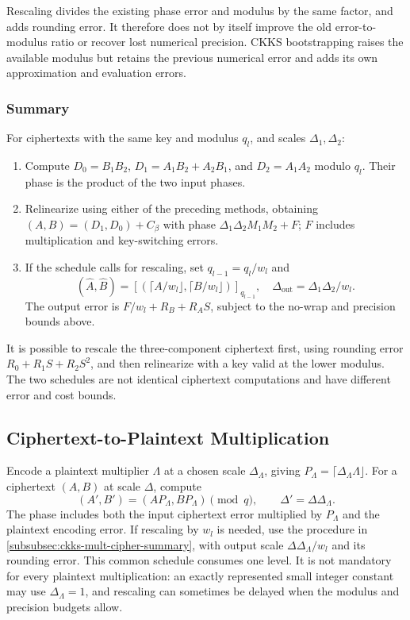  Rescaling divides the existing phase error and modulus by the same factor, and adds rounding error. It therefore does not by itself improve the old error-to-modulus ratio or recover lost numerical precision. CKKS bootstrapping raises the available modulus but retains the previous numerical error and adds its own approximation and evaluation errors.


\subsubsection{Summary}
\label{subsubsec:ckks-mult-cipher-summary}

\begin{tcolorbox}[title={\textbf{\tboxlabel{\ref*{subsubsec:ckks-mult-cipher-summary}} CKKS Ciphertext-to-Ciphertext Multiplication}}]
For ciphertexts with the same key and modulus $q_l$, and scales $\Delta_1,\Delta_2$:
\begin{enumerate}
\item Compute $D_0=B_1B_2$, $D_1=A_1B_2+A_2B_1$, and $D_2=A_1A_2$ modulo $q_l$. Their phase is the product of the two input phases.
\item Relinearize using either of the preceding methods, obtaining $(A,B)=(D_1,D_0)+C_\beta$ with phase $\Delta_1\Delta_2 M_1M_2+F$; $F$ includes multiplication and key-switching errors.
\item If the schedule calls for rescaling, set $q_{l-1}=q_l/w_l$ and
\[
(\widehat A,\widehat B)=[(\lceil A/w_l\rfloor,\lceil B/w_l\rfloor)]_{q_{l-1}},
\quad \Delta_{\mathrm{out}}=\Delta_1\Delta_2/w_l.
\]
The output error is $F/w_l+R_B+R_AS$, subject to the no-wrap and precision bounds above.
\end{enumerate}
 It is possible to rescale the three-component ciphertext first, using rounding error $R_0+R_1S+R_2S^2$, and then relinearize with a key valid at the lower modulus. The two schedules are not identical ciphertext computations and have different error and cost bounds.
\end{tcolorbox}


\subsection{Ciphertext-to-Plaintext Multiplication}
\label{subsec:ckks-mult-plain}

Encode a plaintext multiplier $\Lambda$ at a chosen scale $\Delta_\Lambda$, giving $P_\Lambda=\lceil\Delta_\Lambda\Lambda\rfloor$. For a ciphertext $(A,B)$ at scale $\Delta$, compute
\[
(A',B')=(AP_\Lambda,BP_\Lambda)\pmod q,
\qquad \Delta'=\Delta\Delta_\Lambda.
\]
The phase includes both the input ciphertext error multiplied by $P_\Lambda$ and the plaintext encoding error. If rescaling by $w_l$ is needed, use the procedure in \autoref{subsubsec:ckks-mult-cipher-summary}, with output scale $\Delta\Delta_\Lambda/w_l$ and its rounding error. This common schedule consumes one level. It is not mandatory for every plaintext multiplication: an exactly represented small integer constant may use $\Delta_\Lambda=1$, and rescaling can sometimes be delayed when the modulus and precision budgets allow.


